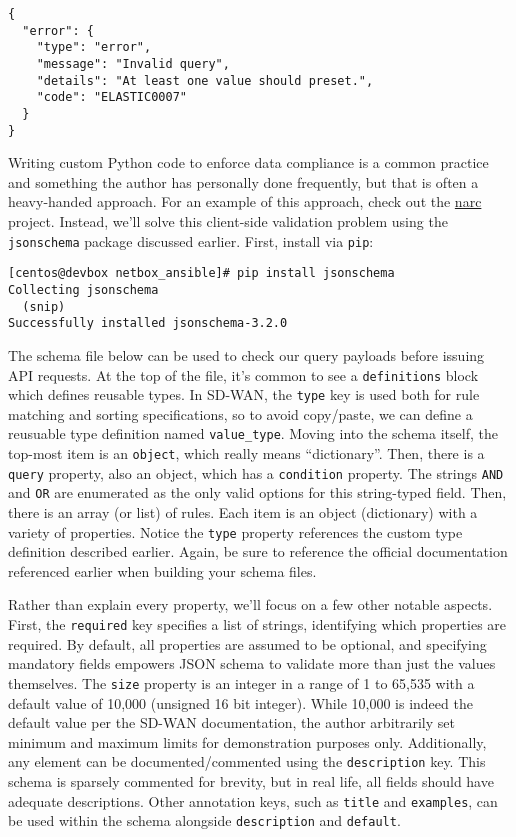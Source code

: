 \begin{verbatim}
{
  "error": {
    "type": "error",
    "message": "Invalid query",
    "details": "At least one value should preset.",
    "code": "ELASTIC0007"
  }
}
\end{verbatim}

Writing custom Python code to enforce data compliance is a common practice and
something the author has personally done frequently, but that is often a
heavy-handed approach. For an example of this approach, check out the
\href{https://github.com/nickrusso42518/narc}{narc} project.
Instead, we'll solve this client-side validation problem using the
\verb|jsonschema| package discussed earlier. First, install via \verb|pip|:

\begin{verbatim}
[centos@devbox netbox_ansible]# pip install jsonschema
Collecting jsonschema
  (snip)
Successfully installed jsonschema-3.2.0
\end{verbatim}

The schema file below can be used to check our query payloads before issuing
API requests. At the top of the file, it's common to see a \verb|definitions|
block which defines reusable types. In SD-WAN, the \verb|type| key is used
both for rule matching and sorting specifications, so to avoid copy/paste,
we can define a reusuable type definition named \verb|value_type|. Moving
into the schema itself, the top-most item is an \verb|object|, which really
means ``dictionary''. Then, there is a \verb|query| property, also an object,
which has a \verb|condition| property. The strings \verb|AND| and \verb|OR|
are enumerated as the only valid options for this string-typed field. Then,
there is an array (or list) of rules. Each item is an object (dictionary)
with a variety of properties. Notice the \verb|type| property references
the custom type definition described earlier. Again, be sure to reference
the official documentation referenced earlier when building your schema files.

Rather than explain every property, we'll focus on a few other notable aspects.
First, the \verb|required| key specifies a list of strings, identifying which
properties are required. By default, all properties are assumed to be optional,
and specifying mandatory fields empowers JSON schema to validate more than just
the values themselves. The \verb|size| property is an integer in a range of
1 to 65,535 with a default value of 10,000 (unsigned 16 bit integer). While
10,000 is indeed the default value per the SD-WAN documentation, the author
arbitrarily set minimum and maximum limits for demonstration purposes only.
Additionally, any element can be documented/commented using the
\verb|description| key. This schema is sparsely commented for brevity, but
in real life, all fields should have adequate descriptions. Other annotation
keys, such as \verb|title| and \verb|examples|, can be used within the schema
alongside \verb|description| and \verb|default|.

